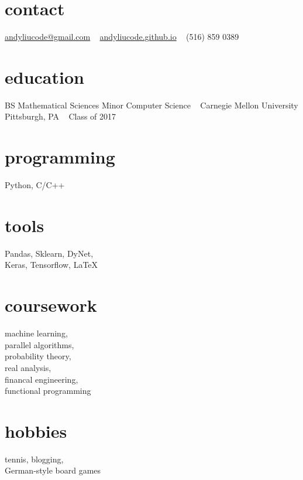 \documentclass[print]{friggeri-cv} %
\begin{document}


\begin{aside} %
\section{contact}
\href{mailto:andyliucode@gmail.com}{andyliucode@gmail.com}
~
\href{https://andyliucode.github.io}{andyliucode.github.io}
~
(516) 859 0389
\section{education}
BS Mathematical Sciences
Minor Computer Science
~
Carnegie Mellon University
Pittsburgh, PA
~
Class of 2017
\section{programming} 
Python, C/C++
\section{tools}
Pandas, Sklearn, DyNet, \\Keras, Tensorflow, LaTeX
\section{coursework}
machine learning, \\parallel algorithms, \\probability theory, \\real analysis, \\financal engineering, \\functional programming
\section{hobbies}
tennis, blogging, \\German-style board games
\end{aside}

\end{document}
